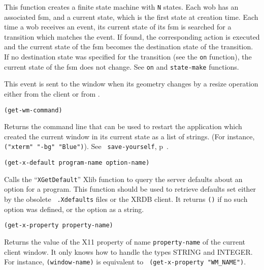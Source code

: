This function creates a finite state machine with {\tt N} states. Each wob
has an associated fsm, and a current state, which is the first state at
creation time. Each time a wob receives an event, its current state of its
fsm is searched for a transition which matches the event. If found, the
corresponding action is executed and the current state of the fsm becomes
the destination state of the transition. If no destination state was
specified for the transition (see the \verb"on" function), the current state
of the fsm does not change. See \verb"on" and \verb"state-make" functions.

        

This event is sent to the window when its geometry changes by a resize
operation either from the client or from {\GWM}.


{\usagefont\begin{verbatim}
(get-wm-command)
\end{verbatim}}\usageupspace

Returns the command line that can be used to restart the application
which created the current window in its current state as a list of
strings.  (For instance, \verb|("xterm" "-bg" "Blue")|). See {\tt
save-yourself}, p~\pageref{save-yourself}.


{\usagefont\begin{verbatim}
(get-x-default program-name option-name)
\end{verbatim}}\usageupspace

Calls the ``{\tt XGetDefault}'' Xlib function to
query the server defaults about an option for a program. This function
should be used to retrieve defaults set either by the obsolete {\tt
.Xdefaults} files or the XRDB client. It returns \verb"()" if no such
option was defined, or the option as a {\WOOL} string.

        
{\usagefont\begin{verbatim}
(get-x-property property-name)
\end{verbatim}}\usageupspace

Returns the value of the X11 property of name \verb"property-name" of
the current client window. It only knows how to handle the types STRING
and INTEGER. For instance, {\tt (window-name)} is equivalent to {\tt
(get-x-property "WM\_NAME")}.

